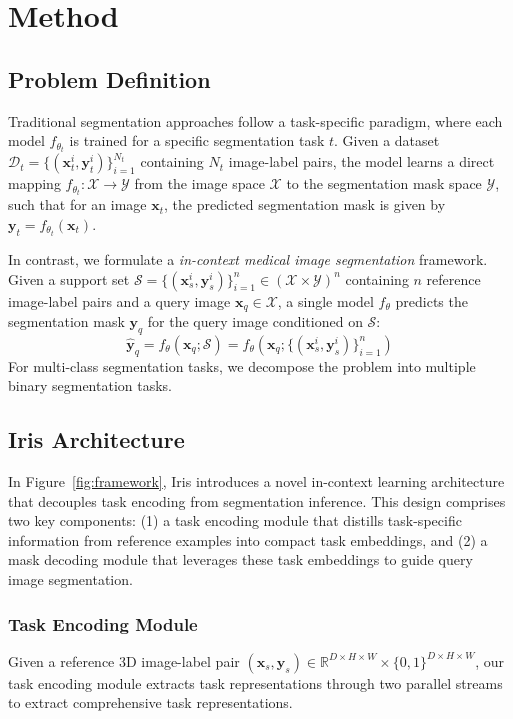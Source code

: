 \section{Method}
\label{sec:method}


\subsection{Problem Definition}
Traditional segmentation approaches follow a task-specific paradigm, where each model $f_{\theta_t}$ is trained for a specific segmentation task $t$. Given a dataset $\mathcal{D}_t = \{(\boldsymbol{x}_{t}^{i}, \boldsymbol{y}_{t}^{i})\}_{i=1}^{N_t}$ containing $N_t$ image-label pairs, the model learns a direct mapping $f_{\theta_t}: \mathcal{X} \rightarrow \mathcal{Y}$ from the image space $\mathcal{X}$ to the segmentation mask space $\mathcal{Y}$, such that for an image $\boldsymbol{x}_t$, the predicted segmentation mask is given by $\boldsymbol{y}_t = f_{\theta_t}(\boldsymbol{x}_t)$. 


In contrast, we formulate a \textit{in-context medical image segmentation} framework. Given a support set $\mathcal{S} = \{(\boldsymbol{x}_s^i, \boldsymbol{y}_s^i)\}_{i=1}^n \in (\mathcal{X} \times \mathcal{Y})^n$ containing $n$ reference image-label pairs and a query image $\boldsymbol{x}_q \in \mathcal{X}$, a single model $f_\theta$ predicts the segmentation mask $\boldsymbol{y}_q$ for the query image conditioned on $\mathcal{S}$:
\begin{equation}
    \boldsymbol{\hat{y}}_q = f_\theta(\boldsymbol{x}_q; \mathcal{S}) = f_\theta(\boldsymbol{x}_q; \{(\boldsymbol{x}_s^i, \boldsymbol{y}_s^i)\}_{i=1}^n)
\end{equation}
For multi-class segmentation tasks, we decompose the problem into multiple binary segmentation tasks.


\subsection{Iris Architecture}
In Figure~\ref{fig:framework}, Iris introduces a novel in-context learning architecture that decouples task encoding from segmentation inference. This design comprises two key components: (1) a task encoding module that distills task-specific information from reference examples into compact task embeddings, and (2) a mask decoding module that leverages these task embeddings to guide query image segmentation.

\subsubsection*{Task Encoding Module}
Given a reference 3D image-label pair $(\boldsymbol{x}_s, \boldsymbol{y}_s) \in \mathbb{R}^{D \times H \times W} \times \{0,1\}^{D \times H \times W}$, our task encoding module extracts task representations through two parallel streams to extract comprehensive task representations.


